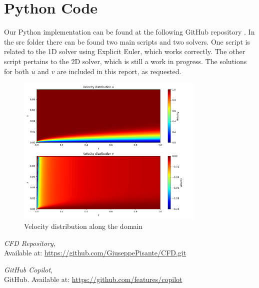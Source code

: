 \documentclass{article}
\begin{document}
\section*{Python Code}
Our Python implementation can be found at the following GitHub repository \cite{GitHubRepo}. In the src folder there can be found two main scripts and two solvers.
One script is related to the 1D solver using Explicit Euler, which works correctly. The other script pertains to the 2D solver, which is still a work in progress. 
The solutions for both \( u \) and \( v \) are included in this report, as requested.
\begin{figure}[h!]
  \centering
  \includegraphics[width=0.8\textwidth]{velocity_distribution.png}
  \caption{Velocity distribution along the domain}
  \label{fig:velocity_distribution}
\end{figure}

\begin{thebibliography}{9}
    \textit{CFD Repository},\\
    Available at: \url{https://github.com/GiuseppePisante/CFD.git}
    
    \textit{GitHub Copilot},\\
    GitHub. Available at: \url{https://github.com/features/copilot}
    \end{thebibliography}
\end{document}
